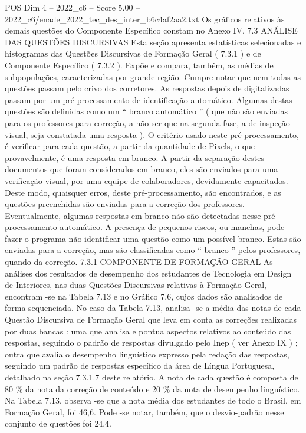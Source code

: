 \begin{textsample}{POS Dim 4 – 2022\_c6 – Score 5.00 – 2022\_c6/enade\_2022\_tec\_des\_inter\_b6c4af2aa2.txt}
Os gráficos relativos às demais questões do Componente Específico constam no Anexo IV. 7.3 ANÁLISE DAS QUESTÕES DISCURSIVAS Esta seção apresenta estatísticas selecionadas e histogramas das Questões Discursivas de Formação Geral ( 7.3.1 ) e de Componente Específico ( 7.3.2 ).
Expõe e compara, também, as médias de subpopulações, caracterizadas por grande região.
Cumpre notar que nem todas as questões passam pelo crivo dos corretores.
As respostas depois de digitalizadas passam por um pré-processamento de identificação automático.
Algumas destas questões são definidas como um “ branco automático ” ( que não são enviadas para os professores para correção, a não ser que na segunda fase, a de inspeção visual, seja constatada uma resposta ).
O critério usado neste pré-processamento, é verificar para cada questão, a partir da quantidade de Pixels, o que provavelmente, é uma resposta em branco.
A partir da separação destes documentos que foram considerados em branco, eles são enviados para uma verificação visual, por uma equipe de colaboradores, devidamente capacitados.
Deste modo, quaisquer erros, deste pré-processamento, são encontrados, e as questões preenchidas são enviadas para a correção dos professores.
Eventualmente, algumas respostas em branco não são detectadas nesse pré-processamento automático.
A presença de pequenos riscos, ou manchas, pode fazer o programa não identificar uma questão como um possível branco.
Estas são enviadas para a correção, mas são classificadas como “ branco ” pelos professores, quando da correção. 7.3.1 COMPONENTE DE FORMAÇÃO GERAL As análises dos resultados de desempenho dos estudantes de Tecnologia em Design de Interiores, nas duas Questões Discursivas relativas à Formação Geral, encontram -se na Tabela 7.13 e no Gráfico 7.6, cujos dados são analisados de forma sequenciada.
No caso da Tabela 7.13, analisa -se a média das notas de cada Questão Discursiva de Formação Geral que leva em conta as correções realizadas por duas bancas : uma que analisa e pontua aspectos relativos ao conteúdo das respostas, seguindo o padrão de respostas divulgado pelo Inep ( ver Anexo IX ) ; outra que avalia o desempenho linguístico expresso pela redação das respostas, seguindo um padrão de respostas específico da área de Língua Portuguesa, detalhado na seção 7.3.1.7 deste relatório.
A nota de cada questão é composta de 80 \% da nota da correção de conteúdo e 20 \% da nota de desempenho linguístico.
Na Tabela 7.13, observa -se que a nota média dos estudantes de todo o Brasil, em Formação Geral, foi 46,6.
Pode -se notar, também, que o desvio-padrão nesse conjunto de questões foi 24,4.

\end{textsample}
